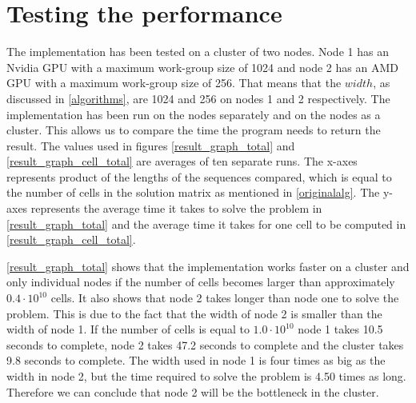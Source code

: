 \begin{figure*}[htb]
    \centering
    \subfloat[][Overview]{\label{result_graph}}%
    \subfloat[][Zoomed in]{\label{result_graph_zoom}}
    \caption{Average time to compute edit distance} \label{result_graph_total}
\end{figure*}

\begin{figure*}[htb]
    \centering
    \subfloat[][Overview]{\label{result_graph_cell}}%
    \subfloat[][Zoomed in]{\label{result_graph_cell_zoom}}
    \caption{Average time per cell} \label{result_graph_cell_total}
\end{figure*}

\section{Testing the performance} \label{testing}
The implementation has been tested on a cluster of two nodes.
Node 1 has an Nvidia GPU with a maximum work-group size of 1024 and node 2 has an AMD GPU with a maximum work-group size of 256.
That means that the $width$, as discussed in \cref{algorithms}, are 1024 and 256 on nodes 1 and 2 respectively.
The implementation has been run on the nodes separately and on the nodes as a cluster.
This allows us to compare the time the program needs to return the result.
The values used in figures \ref{result_graph_total} and \ref{result_graph_cell_total} are averages of ten separate runs.
The x-axes represents product of the lengths of the sequences compared, which is equal to the number of cells in the solution matrix as mentioned in \cref{originalalg}.
The y-axes represents the average time it takes to solve the problem in \cref{result_graph_total} and the average time it takes for one cell to be computed in \cref{result_graph_cell_total}.

\cref{result_graph_total} shows that the implementation works faster on a cluster and only individual nodes if the number of cells becomes larger than approximately $0.4 \cdot 10^{10}$ cells.
It also shows that node 2 takes longer than node one to solve the problem.
This is due to the fact that the width of node 2 is smaller than the width of node 1.
If the number of cells is equal to $1.0 \cdot 10^{10}$ node 1 takes 10.5 seconds to complete, node 2 takes 47.2 seconds to complete and the cluster takes 9.8 seconds to complete.
The width used in node 1 is four times as big as the width in node 2, but the time required to solve the problem is 4.50 times as long.
Therefore we can conclude that node 2 will be the bottleneck in the cluster.

